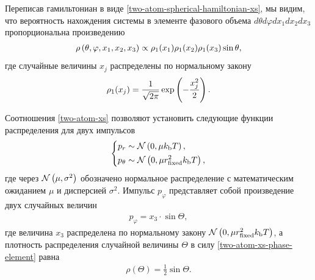 Переписав гамильтониан в виде \eqref{two-atom-spherical-hamiltonian-xs}, мы видим, что вероятность нахождения системы в элементе фазового объема $d\theta d\varphi dx_1 dx_2 dx_3$ пропорциональна произведению 
\begin{gather}
    \rho \left( \theta, \varphi, x_1, x_2, x_3 \right) \propto \rho_1(x_1) \rho_1(x_2) \rho_1(x_3) \sin \theta, \label{two-atom-xs-phase-element}
\end{gather}
%
где случайные величины $x_j$ распределены по нормальному закону
\begin{gather}
    \rho_1 (x_j) = \frac{1}{\sqrt{2 \pi}} \exp \left( -\frac{x_j^2}{2} \right). 
\end{gather}

Соотношения \eqref{two-atom-xs} позволяют установить следующие функции распределения для двух импульсов
\begin{gather}
    \left\{
    \begin{aligned}
        p_r &\sim \mathcal{N} \left( 0, \mu k_\text{b} T \right), \\
        p_\theta &\sim \mathcal{N} \left( 0, \mu r_\text{fixed}^2 k_\text{b} T \right), 
    \end{aligned}
    \right.
\end{gather}
%
где через $\mathcal{N} \left( \mu, \sigma^2 \right)$ обозначено нормальное распределение с математическим ожиданием $\mu$ и дисперсией $\sigma^2$. Импульс $p_\varphi$ представляет собой произведение двух случайных величин
\begin{gather}
    p_\varphi = x_3 \cdot \sin \Theta, \label{two-atom-pvarphi-generation}
\end{gather}
% 
где величина $x_3$ распределена по нормальному закону $\mathcal{N} \left( 0, \mu r_\text{fixed}^2 k_\text{b} T \right)$, а плотность распределения случайной величины $\Theta$ в силу \eqref{two-atom-xs-phase-element} равна
\begin{gather}
    \rho(\Theta) = \frac{1}{2} \sin \Theta.
\end{gather}

